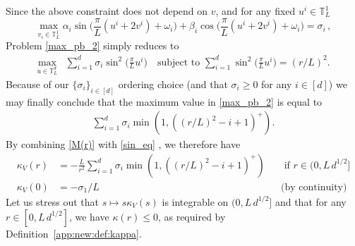 \documentclass[final,12pt]{colt2023} %
\newcommand{\bes}{\begin{equation}}
\newcommand{\ees}{\end{equation}}
\begin{document}
Since the above constraint does not depend on $v$, and for any fixed $u^i \in \mathbb{T}^1_L$  
\bes   \max_{v_i\in\mathbb{T}_L^1} \alpha_i \sin\biggl(\frac{\pi}{L} (u^i +2v^i)+\omega_i\biggr) + \beta_i \cos\biggl(\frac{\pi}{L} (u^i +2v^i)+\omega_i\biggr)=\sigma_i\,,\ees
 Problem \eqref{max_pb_2} simply reduces to
\begin{align}
    \max_{u\in \mathbb{T}_L^d} &
    \sum_{i=1}^d \sigma_i \sin^2\biggl(\frac{\pi}{L} u^i\biggr) \quad  \text{subject to } \sum_{i=1}^d \sin^2\biggl(\frac{\pi}{L} u^i\biggr)=(r/L)^2.
\end{align}
Because of our $\{\sigma_i\}_{i \in [d]}$ ordering choice (and that $\sigma_i \geq 0$ for any $i \in [d]$) we may finally conclude that the maximum value in \eqref{max_pb_2} is equal to
\begin{align}
    \sum_{i=1}^d  \sigma_i \min(1 , ((r/L)^2 -i+1)^+) \label{M(r)}.
\end{align}
By combining \eqref{M(r)} with \eqref{sin_eq} , we therefore have
\begin{align}
    \kappa_V(r)&=-\frac{L}{r^2}\sum_{i=1}^d \sigma_i \min(1, ((r/L)^2 -i+1)^+) && \text{ if } r\in (0,L \, d^{1/2}]\\
    \kappa_V(0)&=-\sigma_1/L && \text{(by continuity)}
\end{align}
Let us stress out that $s \mapsto s\kappa_V(s)$ is integrable on $(0,L \, d^{1/2}]$ and that for any $r\in [0,L \,d^{1/2}]$, we have $\kappa(r)\leq 0$, as required by Definition~\ref{app:new:def:kappa}. 
\end{document}
